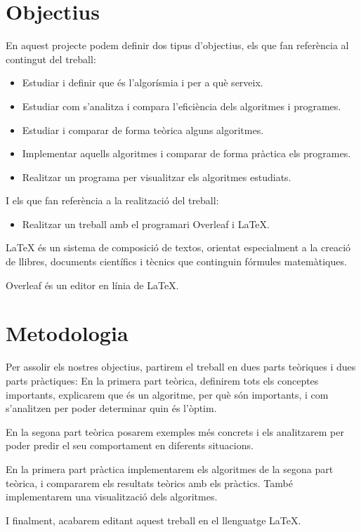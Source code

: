 \section*{Objectius}
En aquest projecte podem definir dos tipus d'objectius, els que fan referència al contingut del treball:
\begin{itemize}
    \item Estudiar i definir que és l'algorísmia i per a què serveix. 
    \item Estudiar com s'analitza i compara l'eficiència dels algoritmes i programes.
    \item Estudiar i comparar de forma teòrica alguns algoritmes.
    \item Implementar aquells algoritmes i comparar de forma pràctica els programes.
    \item Realitzar un programa per visualitzar els algoritmes estudiats.
\end{itemize}
I els que fan referència a la realització del treball:
\begin{itemize}
    \item Realitzar un treball amb el programari Overleaf i \LaTeX.
\end{itemize}

LaTeX és un sistema de composició de textos, orientat especialment a la creació de llibres, documents científics i tècnics que continguin fórmules matemàtiques. 

Overleaf és un editor en línia de \LaTeX. 


\section*{Metodologia}
Per assolir els nostres objectius, partirem el treball en dues parts teòriques i dues parts pràctiques: En la primera part teòrica, definirem tots els conceptes importants, explicarem que és un algoritme, per què són importants, i com s'analitzen per poder determinar quin és l'òptim. 

En la segona part teòrica posarem exemples més concrets i els analitzarem per poder predir el seu comportament en diferents situacions. 

En la primera part pràctica implementarem els algoritmes de la segona part teòrica, i compararem els resultats teòrics amb els pràctics. També implementarem una visualització dels algoritmes.

I finalment, acabarem editant aquest treball en el llenguatge \LaTeX.